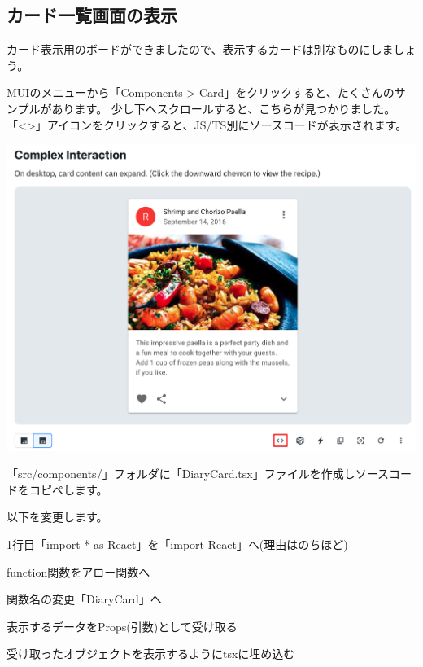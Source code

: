 \clearpage


\subsection{カード一覧画面の表示}
\keeplastskip{
  \label{sec:3-3-4}
  \label{sec-0332}
  \par\nobreak
}

カード表示用のボードができましたので、表示するカードは別なものにしましょう。

\vspace*{\baselineskip}

MUIのメニューから「Components \textgreater{} Card」をクリックすると、たくさんのサンプルがあります。
少し下へスクロールすると、こちらが見つかりました。
「\textless{}\textgreater{}」アイコンをクリックすると、JS/TS別にソースコードが表示されます。

\begin{reviewimage}[H]%
\includegraphics[width=0.9\maxwidth]{./images/03-todo-with-react/mui009-card-ComplexInteraction.png}%
\label{image:03-todo-with-react:mui009-card-ComplexInteraction}
\end{reviewimage}

「src/components/」フォルダに「DiaryCard.tsx」ファイルを作成しソースコードをコピペします。

以下を変更します。

\begin{starteritemize}
\item 1行目「import * as React」を「import React」へ(理由はのちほど)
\item function関数をアロー関数へ
\item 関数名の変更「DiaryCard」へ
\item 表示するデータをProps(引数)として受け取る
\item 受け取ったオブジェクトを表示するようにtsxに埋め込む
\end{starteritemize}

